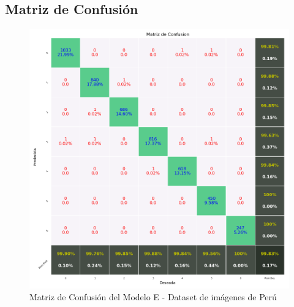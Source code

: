 	 	\subsection{Matriz de Confusión}  
			\begin{figure}[H]
				\begin{center}
				\includegraphics[width=1\textwidth, height=11.2cm,keepaspectratio]{images/desarrollo/testResults/peru/modelE} 
				\end{center}
				\begin{center}
				\caption{\small{Matriz de Confusión del Modelo E - Dataset de imágenes de Perú}}
				
				{\small{\fontsize{10}{16.8}\selectfont {Fuente: Elaboración propia}}}
				\end{center}
				\vspace{-1.5em}
			\end{figure}
